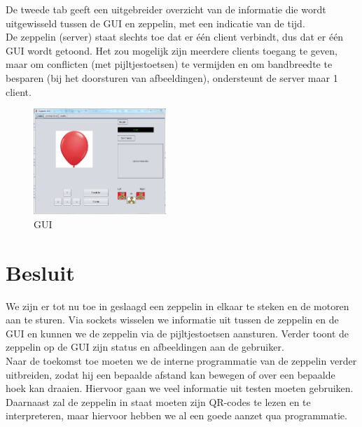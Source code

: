 \documentclass[eind]{penoverslag}
\begin{document}
De tweede tab geeft een uitgebreider overzicht van de informatie die wordt uitgewisseld tussen de GUI en zeppelin, met een indicatie van de tijd. \\

De zeppelin (server) staat slechts toe dat er \'e\'en client verbindt, dus dat er \'e\'en GUI wordt getoond. Het zou mogelijk zijn meerdere clients toegang te geven, maar om conflicten (met pijltjestoetsen) te vermijden en om bandbreedte te besparen (bij het doorsturen van afbeeldingen), ondersteunt de server maar 1 client. \\

\begin{figure}[ht!]
\centering
\includegraphics[height=40mm]{GUI.png}
\caption{GUI}
\label{GUI}
\end{figure}


\section{Besluit}
We zijn er tot nu toe in geslaagd een zeppelin in elkaar te steken en de motoren aan te sturen. Via sockets wisselen we informatie uit tussen de zeppelin en de GUI en kunnen we de zeppelin via de pijltjestoetsen aansturen. Verder toont de zeppelin op de GUI zijn status en afbeeldingen aan de gebruiker. \\

Naar de toekomst toe moeten we de interne programmatie van de zeppelin verder uitbreiden, zodat hij een bepaalde afstand kan bewegen of over een bepaalde hoek kan draaien. Hiervoor gaan we veel informatie uit testen moeten gebruiken. Daarnaast zal de zeppelin in staat moeten zijn QR-codes te lezen en te interpreteren, maar hiervoor hebben we al een goede aanzet qua programmatie.



\newpage\makeappendix
\end{document}
